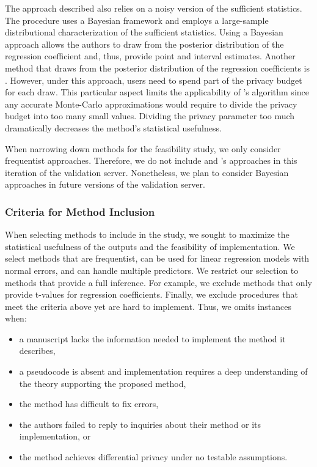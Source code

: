 The approach described \citet{bernstein2019differentially} also relies on a noisy version of the sufficient statistics. The procedure uses a Bayesian framework and employs a large-sample distributional characterization of the sufficient statistics. Using a Bayesian approach allows the authors to draw from the posterior distribution of the regression coefficient and, thus, provide point and interval estimates. Another method that draws from the posterior distribution of the regression coefficients is \citet{wang2018revisiting}. However, under this approach, users need to spend part of the privacy budget for each draw. This particular aspect limits the applicability of \citet{wang2018revisiting}'s algorithm since any accurate Monte-Carlo approximations would require to divide the privacy budget into too many small values. Dividing the privacy parameter too much dramatically decreases the method's statistical usefulness.

When narrowing down methods for the feasibility study, we only consider frequentist approaches. Therefore, we do not include \citet{bernstein2019differentially} and \citet{wang2018revisiting}'s approaches in this iteration of the validation server. Nonetheless, we plan to consider Bayesian approaches in future versions of the validation server.

\subsubsection{Criteria for Method Inclusion}

When selecting methods to include in the study, we sought to maximize the statistical usefulness of the outputs and the feasibility of implementation. We select methods that are frequentist, can be used for linear regression models with normal errors, and can handle multiple predictors. We restrict our selection to methods that provide a full inference. For example, we exclude methods that only provide t-values for regression coefficients. Finally, we exclude procedures that meet the criteria above yet are hard to implement. Thus, we omits instances when: 
\begin{itemize}
    \item a manuscript lacks the information needed to implement the method it describes,
    \item a pseudocode is absent and implementation requires a deep understanding of the theory supporting the proposed method,
    \item the method has difficult to fix errors,
    \item the authors failed to reply to inquiries about their method or its implementation, or
    \item the method achieves differential privacy under no testable assumptions.
\end{itemize}


